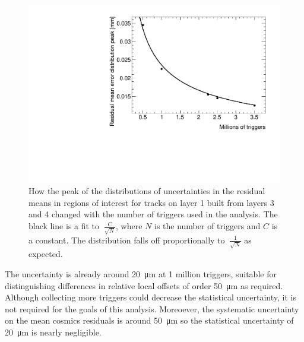 \begin{figure}
    \centering
    \includegraphics[width = \textwidth]{figures/figure_QS3P18_2900V_peakOfMeanErrorsDistVsTriggers_layer1_fixedlayers34.pdf}
    \caption{How the peak of the distributions of uncertainties in the residual means in regions of interest for tracks on layer 1 built from layers 3 and 4 changed with the number of triggers used in the analysis. The black line is a fit to $~\frac{C}{\sqrt{N}}$, where $N$ is the number of triggers and $C$ is a constant. The distribution falls off proportionally to $~\frac{1}{\sqrt{N}}$ as expected.}
    \label{fig:res_mean_uncert_vs_triggers}
\end{figure}

The uncertainty is already around \SI{20}{\micro\meter} at 1 million triggers, suitable for distinguishing differences in relative local offsets of order \SI{50}{\micro\meter} as required. Although collecting more triggers could decrease the statistical uncertainty, it is not required for the goals of this analysis. Moreoever, the systematic uncertainty on the mean cosmics residuals is around \SI{50}{\micro\meter} so the statistical uncertainty of \SI{20}{\micro\meter} is nearly negligible.

